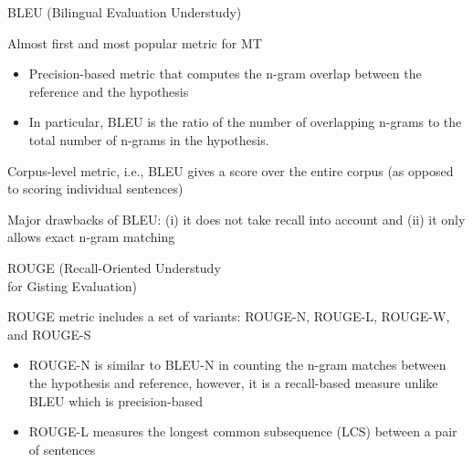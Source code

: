 \documentclass[12pt,aspectratio=169,handout]{beamer}
\begin{document}
\begin{frame}{BLEU (Bilingual Evaluation Understudy)}

Almost first and most popular metric for MT

\begin{itemize}
	\item Precision-based metric that computes the n-gram overlap between the reference and the hypothesis
	\item In particular, BLEU is the ratio of the number of overlapping n-grams to the total number of n-grams in the hypothesis.
\end{itemize}


Corpus-level metric, i.e., BLEU gives a score over the entire corpus (as opposed to scoring individual sentences)

Major drawbacks of BLEU: (i) it does not take recall into account and (ii) it only allows exact n-gram matching


\end{frame}


\begin{frame}{ROUGE (Recall-Oriented Understudy\\ for Gisting Evaluation)}
	
ROUGE metric includes a set of variants: ROUGE-N, ROUGE-L, ROUGE-W, and ROUGE-S

\begin{itemize}
	\item ROUGE-N is similar to BLEU-N in counting the n-gram matches between the hypothesis and reference, however, it is a recall-based measure unlike BLEU which is precision-based
	\item ROUGE-L measures the longest common subsequence (LCS) between a pair of sentences	
\end{itemize}



\end{frame}
\end{document}
